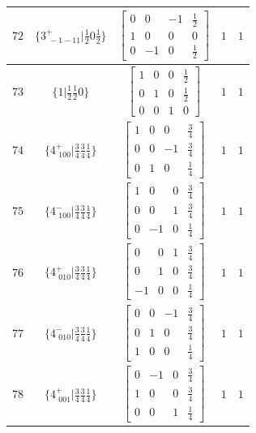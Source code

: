 \documentclass[fleqn,8pt]{jsarticle}
\begin{document}
\begin{longtable}{ccccc}
$ 72 $ & $ \{3^{+}_{\,\,-1-11}|\frac{1}{2} 0 \frac{1}{2}\} $ & $ \begin{bmatrix} 0 & 0 & -1 & \frac{1}{2} \\ 1 & 0 & 0 & 0 \\ 0 & -1 & 0 & \frac{1}{2} \end{bmatrix} $ & $ 1 $ & $ 1 $ \\ \hline
$ 73 $ & $ \{1|\frac{1}{2} \frac{1}{2} 0\} $ & $ \begin{bmatrix} 1 & 0 & 0 & \frac{1}{2} \\ 0 & 1 & 0 & \frac{1}{2} \\ 0 & 0 & 1 & 0 \end{bmatrix} $ & $ 1 $ & $ 1 $ \\ \hline
$ 74 $ & $ \{4^{+}_{\,\,100}|\frac{3}{4} \frac{3}{4} \frac{1}{4}\} $ & $ \begin{bmatrix} 1 & 0 & 0 & \frac{3}{4} \\ 0 & 0 & -1 & \frac{3}{4} \\ 0 & 1 & 0 & \frac{1}{4} \end{bmatrix} $ & $ 1 $ & $ 1 $ \\ \hline
$ 75 $ & $ \{4^{-}_{\,\,100}|\frac{3}{4} \frac{3}{4} \frac{1}{4}\} $ & $ \begin{bmatrix} 1 & 0 & 0 & \frac{3}{4} \\ 0 & 0 & 1 & \frac{3}{4} \\ 0 & -1 & 0 & \frac{1}{4} \end{bmatrix} $ & $ 1 $ & $ 1 $ \\ \hline
$ 76 $ & $ \{4^{+}_{\,\,010}|\frac{3}{4} \frac{3}{4} \frac{1}{4}\} $ & $ \begin{bmatrix} 0 & 0 & 1 & \frac{3}{4} \\ 0 & 1 & 0 & \frac{3}{4} \\ -1 & 0 & 0 & \frac{1}{4} \end{bmatrix} $ & $ 1 $ & $ 1 $ \\ \hline
$ 77 $ & $ \{4^{-}_{\,\,010}|\frac{3}{4} \frac{3}{4} \frac{1}{4}\} $ & $ \begin{bmatrix} 0 & 0 & -1 & \frac{3}{4} \\ 0 & 1 & 0 & \frac{3}{4} \\ 1 & 0 & 0 & \frac{1}{4} \end{bmatrix} $ & $ 1 $ & $ 1 $ \\ \hline
$ 78 $ & $ \{4^{+}_{\,\,001}|\frac{3}{4} \frac{3}{4} \frac{1}{4}\} $ & $ \begin{bmatrix} 0 & -1 & 0 & \frac{3}{4} \\ 1 & 0 & 0 & \frac{3}{4} \\ 0 & 0 & 1 & \frac{1}{4} \end{bmatrix} $ & $ 1 $ & $ 1 $ \\ \hline

\end{longtable}
\end{document}
